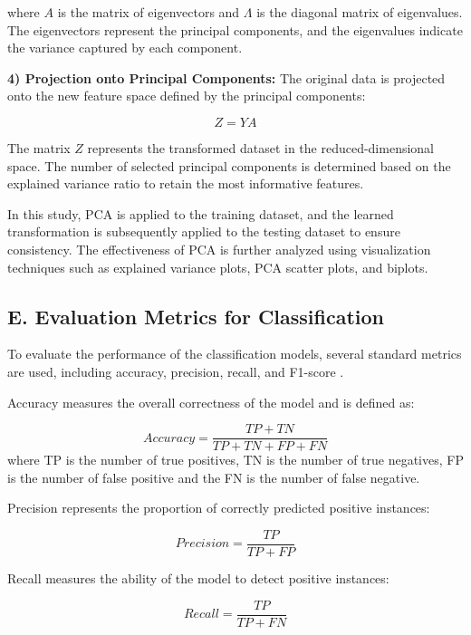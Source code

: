 \documentclass[conference]{IEEEtran}
\begin{document}
where $A$ is the matrix of eigenvectors and $\Lambda$ is the diagonal matrix of eigenvalues. The eigenvectors represent the principal components, and the eigenvalues indicate the variance captured by each component.

\textbf{4) Projection onto Principal Components:}  
The original data is projected onto the new feature space defined by the principal components:

\begin{equation}
Z = Y A
\end{equation}

The matrix $Z$ represents the transformed dataset in the reduced-dimensional space. The number of selected principal components is determined based on the explained variance ratio to retain the most informative features.

In this study, PCA is applied to the training dataset, and the learned transformation is subsequently applied to the testing dataset to ensure consistency. The effectiveness of PCA is further analyzed using visualization techniques such as explained variance plots, PCA scatter plots, and biplots.

\subsection{E. Evaluation Metrics for Classification}

To evaluate the performance of the classification models, several standard metrics are used, including accuracy, precision, recall, and F1-score \cite{b12}.

Accuracy measures the overall correctness of the model and is defined as:

\begin{equation}
Accuracy = \frac{TP + TN}{TP + TN + FP + FN}
\end{equation}
where TP is the number of true positives, TN is the number of true negatives, FP is the number of false positive and the FN is the number of false negative.

Precision represents the proportion of correctly predicted positive instances:

\begin{equation}
Precision = \frac{TP}{TP + FP}
\end{equation}

Recall measures the ability of the model to detect positive instances:

\begin{equation}
Recall = \frac{TP}{TP + FN}
\end{equation}
\end{document}
